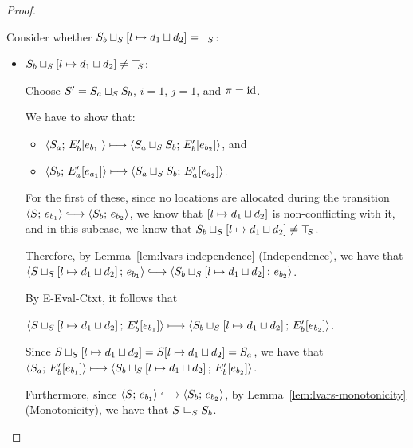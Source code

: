 \begin{proof}
\begin{enumerate}
\begin{enumerate}
      Consider whether
      $S_b \sqcup_{S} \left[ l \mapsto d_1 \sqcup d_2 \right]
      = \top\hspace{-0.85mm}_{S}$:

      \begin{itemize}
      \item
        $S_b \sqcup_{S} \left[ l \mapsto d_1 \sqcup d_2 \right]
        \neq \top\hspace{-0.85mm}_{S}$:

        Choose $S' = S_a \sqcup_{S} S_b$, $i = 1$, $j = 1$, and $\pi
        = \mathrm{id}$.

        We have to show that:
        \begin{itemize}
        \item $\langle S_a;\, E'_b\hspace{-0.5mm}\left[e_{b_1}\right] \rangle \longmapsto
          \langle S_a \sqcup_{S} S_b;\, E'_b\hspace{-0.5mm}\left[e_{b_2}\right] \rangle$, and
        \item $\langle S_b;\, E'_a\hspace{-0.5mm}\left[e_{a_1}\right] \rangle \longmapsto
          \langle S_a \sqcup_{S} S_b;\, E'_a\hspace{-0.5mm}\left[e_{a_2}\right] \rangle$.
        \end{itemize}

        For the first of these, since no locations are allocated
        during the transition $\config{S}{e_{b_1}} \parstepsto
        \config{S_b}{e_{b_2}}$, we know that
        $\left[ l \mapsto d_1 \sqcup d_2 \right]$ is
        non-conflicting with it, and in this subcase, we know that
        $S_b \sqcup_{S} \left[ l \mapsto d_1 \sqcup d_2 \right]
        \neq \top\hspace{-0.85mm}_{S}$.

        Therefore, by Lemma~\ref{lem:lvars-independence}
        (Independence), we have that
        $\config{\lubstore{S}{\store{\storebindingRaw{l}{\userlub{d_1}{d_2}}}}}{e_{b_1}}
        \parstepsto
        \config{\lubstore{S_b}{\store{\storebindingRaw{l}{\userlub{d_1}{d_2}}}}}{e_{b_2}}$.

        By {\sc E-Eval-Ctxt}, it follows that


        $\langle S \sqcup_{S} \left[ l \mapsto d_1 \sqcup d_2 \right];\, E'_b\hspace{-0.5mm}\left[e_{b_1}\right] \rangle
        \longmapsto
        \langle S_b \sqcup_{S} \left[ l \mapsto d_1 \sqcup d_2 \right];\, E'_b\hspace{-0.5mm}\left[e_{b_2}\right] \rangle$.

        Since
        $S \sqcup_{S} \left[ l \mapsto d_1 \sqcup d_2 \right]
        = S[l \mapsto d_1 \sqcup d_2] = S_a$, we have that
        $\langle S_a;\, E'_b\hspace{-0.5mm}\left[e_{b_1}\right] \rangle \longmapsto
        \langle S_b \sqcup_{S} \left[ l \mapsto d_1 \sqcup d_2 \right];\, E'_b\hspace{-0.5mm}\left[e_{b_2}\right] \rangle$.

        Furthermore, since $\config{S}{e_{b_1}} \parstepsto
        \config{S_b}{e_{b_2}}$, by Lemma~\ref{lem:lvars-monotonicity}
        (Monotonicity), we have that $S \sqsubseteq_S S_b$.


\end{itemize}
\end{enumerate}
\end{enumerate}
\end{proof}
